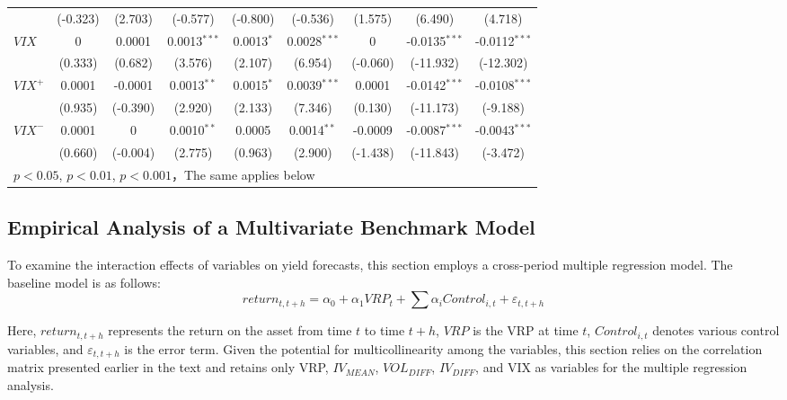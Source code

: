 \documentclass[a4paper, 12pt]{article}    %
\begin{document}
\begin{table}[htbp]
\begin{tabular}{lcccccccc}
&(-0.323) & (2.703) & (-0.577) & (-0.800) & (-0.536) & (1.575) & (6.490) & (4.718) \\
$VIX$ &0 & 0.0001 & 0.0013$^{***}$ & 0.0013$^{*}$ & 0.0028$^{***}$ & 0 & -0.0135$^{***}$ & -0.0112$^{***}$  \\
&(0.333) & (0.682) & (3.576) & (2.107) & (6.954) & (-0.060) & (-11.932) & (-12.302) \\
$VIX^+$ &0.0001 & -0.0001 & 0.0013$^{**}$ & 0.0015$^{*}$ & 0.0039$^{***}$ & 0.0001 & -0.0142$^{***}$ & -0.0108$^{***}$  \\
&(0.935) & (-0.390) & (2.920) & (2.133) & (7.346) & (0.130) & (-11.173) & (-9.188) \\
$VIX^-$ &0.0001 & 0 & 0.0010$^{**}$ & 0.0005 & 0.0014$^{**}$ & -0.0009 & -0.0087$^{***}$ & -0.0043$^{***}$  \\
&(0.660) & (-0.004) & (2.775) & (0.963) & (2.900) & (-1.438) & (-11.843) & (-3.472) \\
\bottomrule
\multicolumn{9}{l}{\footnotesize \sym{*} \(p<0.05\), \sym{**} \(p<0.01\), \sym{***} \(p<0.001\)，The same applies below}\\
\end{tabular}
\end{table}

\subsection{Empirical Analysis of a Multivariate Benchmark Model}
To examine the interaction effects of variables on yield forecasts, this section employs a cross-period multiple regression model. The baseline model is as follows:
        \begin{equation}
		return_{t,t+h} = \alpha_0 + \alpha_1 VRP_t + \sum\alpha_i Control_{i,t} + \varepsilon_{t,t+h}
	\end{equation}
    
Here, $return_{t,t+h}$ represents the return on the asset from time $t$ to time $t+h$, $VRP$ is the VRP at time $t$, $Control_{i,t}$ denotes various control variables, and $\varepsilon_{t,t+h}$ is the error term.
Given the potential for multicollinearity among the variables, this section relies on the correlation matrix presented earlier in the text and retains only VRP, $IV_{MEAN}$, $VOL_{DIFF}$, $IV_{DIFF}$, and VIX as variables for the multiple regression analysis.
\end{document}
